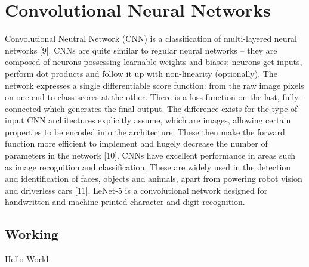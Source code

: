 \chapter{Convolutional Neural Networks}
\label{ch5_cnn}

Convolutional Neutral Network (CNN) is a classification of multi-layered neural networks [9]. CNNs are quite similar to regular neural networks – they are composed of neurons possessing learnable weights and biases; neurons get inputs, perform dot products and follow it up with non-linearity (optionally). The network expresses a single differentiable score function: from the raw image pixels on one end to class scores at the other. There is a loss function on the last, fully-connected which generates the final output. The difference exists for the type of input CNN architectures explicitly assume, which are images, allowing certain properties to be encoded into the architecture. These then make the forward function more efficient to implement and hugely decrease the number of parameters in the network [10]. \newline\newline
CNNs have excellent performance in areas such as image recognition and classification. These are widely used in the detection and identification of faces, objects and animals, apart from powering robot vision and driverless cars [11]. LeNet-5 is a convolutional network designed for handwritten and machine-printed character and digit recognition.

\section{Working}
\label{sect5_1}
Hello World

